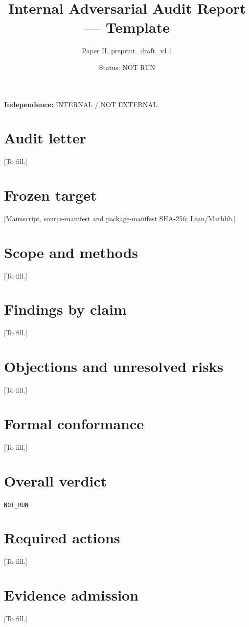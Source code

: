 \documentclass[11pt]{article}
\title{Internal Adversarial Audit Report --- Template}
\author{Paper II, preprint\_draft\_v1.1}
\date{Status: NOT RUN}
\begin{document}
\maketitle
\noindent\textbf{Independence:} INTERNAL / NOT EXTERNAL.

\section{Audit letter}
[To fill.]
\section{Frozen target}
[Manuscript, source-manifest and package-manifest SHA-256; Lean/Mathlib.]
\section{Scope and methods}
[To fill.]
\section{Findings by claim}
[To fill.]
\section{Objections and unresolved risks}
[To fill.]
\section{Formal conformance}
[To fill.]
\section{Overall verdict}
\texttt{NOT\_RUN}
\section{Required actions}
[To fill.]
\section{Evidence admission}
[To fill.]
\end{document}
